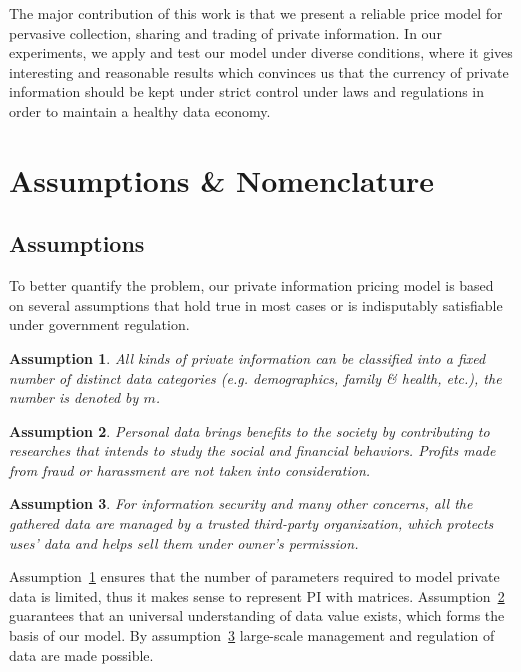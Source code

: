 \documentclass{mcmthesis}
\newtheorem{assumption}{Assumption}
\begin{document}
The major contribution of this work is that we present a reliable price model for pervasive collection, sharing and trading of private information. In our experiments, we apply and test our model under diverse conditions, where it gives interesting and reasonable results which convinces us that the currency of private information should be kept under strict control under laws and regulations in order to maintain a healthy data economy.

\section{Assumptions \& Nomenclature}
\label{sec:assumption_nomenclature}

\subsection{Assumptions}
\label{sec:assumption}

To better quantify the problem, our private information pricing model is based on several assumptions that hold true in most cases or is indisputably satisfiable under government regulation.
\begin{assumption}
	All kinds of private information can be classified into a fixed number of distinct \emph{data categories} (e.g. demographics, family \& health, etc.), the number is denoted by $m$. \label{assumption1}
\end{assumption}

\begin{assumption}
     Personal data brings benefits to the society by contributing to researches that intends to study the social and financial behaviors. Profits made from fraud or harassment are not taken into consideration. \label{assumption2}
\end{assumption}
     
\begin{assumption}
	For information security and many other concerns, all the gathered data are managed by a trusted third-party organization, which protects uses' data and helps sell them under owner's permission. \label{assumption3}
\end{assumption}

Assumption~\ref{assumption1} ensures that the number of parameters required to model private data is limited, thus it makes sense to represent PI with matrices. Assumption~\ref{assumption2} guarantees that an universal understanding of data value exists, which forms the basis of our model. By assumption~\ref{assumption3} large-scale management and regulation of data are made possible.  
\end{document}
